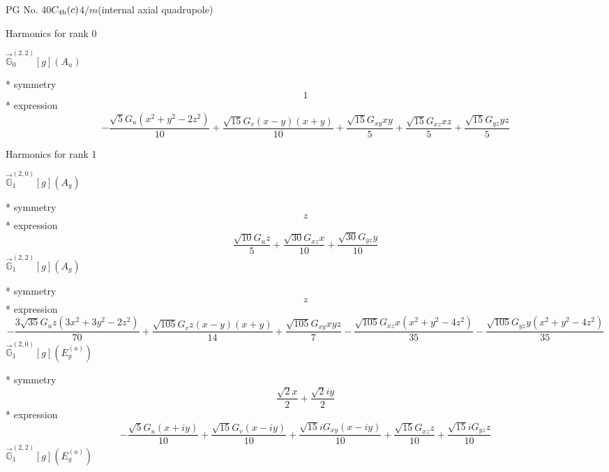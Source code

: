 \documentclass[fleqn,8pt]{jsarticle}
\begin{document}
\setcounter{MaxMatrixCols}{32}

\renewcommand{\tablename}{Table~}
\renewcommand{\figurename}{Figure~}
\begin{center}
\LARGE
PG No. 40\quad$C_{\rm 4h}(c)$\quad$4/m$\quad[ tetragonal ] (internal axial quadrupole)
\end{center}

\noindent * Harmonics for rank 0

\noindent\quad $\vec{\mathbb{G}}_{0}^{(2,2)}[g](A_{u})$

\noindent\quad ** symmetry
\begin{dmath*}
1
\end{dmath*}
\noindent\quad ** expression
\begin{dmath*}
- \frac{\sqrt{5} G_{u} \left(x^{2} + y^{2} - 2 z^{2}\right)}{10} + \frac{\sqrt{15} G_{v} \left(x - y\right) \left(x + y\right)}{10} + \frac{\sqrt{15} G_{xy} x y}{5} + \frac{\sqrt{15} G_{xz} x z}{5} + \frac{\sqrt{15} G_{yz} y z}{5}
\end{dmath*}

\noindent * Harmonics for rank 1

\noindent\quad $\vec{\mathbb{G}}_{1}^{(2,0)}[g](A_{g})$

\noindent\quad ** symmetry
\begin{dmath*}
z
\end{dmath*}
\noindent\quad ** expression
\begin{dmath*}
\frac{\sqrt{10} G_{u} z}{5} + \frac{\sqrt{30} G_{xz} x}{10} + \frac{\sqrt{30} G_{yz} y}{10}
\end{dmath*}
\noindent\quad $\vec{\mathbb{G}}_{1}^{(2,2)}[g](A_{g})$

\noindent\quad ** symmetry
\begin{dmath*}
z
\end{dmath*}
\noindent\quad ** expression
\begin{dmath*}
- \frac{3 \sqrt{35} G_{u} z \left(3 x^{2} + 3 y^{2} - 2 z^{2}\right)}{70} + \frac{\sqrt{105} G_{v} z \left(x - y\right) \left(x + y\right)}{14} + \frac{\sqrt{105} G_{xy} x y z}{7} - \frac{\sqrt{105} G_{xz} x \left(x^{2} + y^{2} - 4 z^{2}\right)}{35} - \frac{\sqrt{105} G_{yz} y \left(x^{2} + y^{2} - 4 z^{2}\right)}{35}
\end{dmath*}
\noindent\quad $\vec{\mathbb{G}}_{1}^{(2,0)}[g](E_{g}^{(a)})$

\noindent\quad ** symmetry
\begin{dmath*}
\frac{\sqrt{2} x}{2} + \frac{\sqrt{2} i y}{2}
\end{dmath*}
\noindent\quad ** expression
\begin{dmath*}
- \frac{\sqrt{5} G_{u} \left(x + i y\right)}{10} + \frac{\sqrt{15} G_{v} \left(x - i y\right)}{10} + \frac{\sqrt{15} i G_{xy} \left(x - i y\right)}{10} + \frac{\sqrt{15} G_{xz} z}{10} + \frac{\sqrt{15} i G_{yz} z}{10}
\end{dmath*}
\noindent\quad $\vec{\mathbb{G}}_{1}^{(2,2)}[g](E_{g}^{(a)})$
\end{document}
